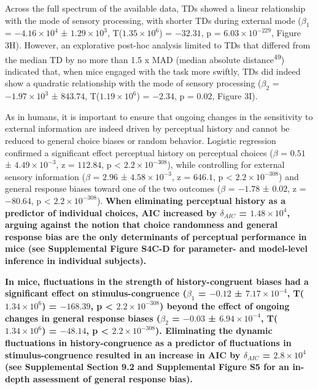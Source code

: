 \documentclass[
]{article}
\begin{document}
Across the full spectrum of the available data, TDs showed a linear
relationship with the mode of sensory processing, with shorter TDs
during external mode (\(\beta_1\) = \(\ensuremath{-4.16\times 10^{4}}\)
± \(\ensuremath{1.29\times 10^{3}}\),
T(\(\ensuremath{1.35\times 10^{6}}\)) = \(-32.31\), p =
\(\ensuremath{6.03\times 10^{-229}}\), Figure 3H). However, an
explorative post-hoc analysis limited to TDs that differed from the
median TD by no more than 1.5 x MAD (median absolute
distance\textsuperscript{49}) indicated that, when mice engaged with the
task more swiftly, TDs did indeed show a quadratic relationship with the
mode of sensory processing (\(\beta_2\) =
\(\ensuremath{-1.97\times 10^{3}}\) ± \(843.74\),
T(\(\ensuremath{1.19\times 10^{6}}\)) = \(-2.34\), p = \(0.02\), Figure
3I).

As in humans, it is important to ensure that ongoing changes in the
sensitivity to external information are indeed driven by perceptual
history and cannot be reduced to general choice biases or random
behavior. Logistic regression confirmed a significant effect perceptual
history on perceptual choices (\(\beta\) = \(0.51\) ±
\(\ensuremath{4.49\times 10^{-3}}\), z = \(112.84\), p < \(\ensuremath{2.2\times 10^{-308}}\)), while
controlling for external sensory information (\(\beta\) = \(2.96\) ±
\(\ensuremath{4.58\times 10^{-3}}\), z = \(646.1\), p < \(\ensuremath{2.2\times 10^{-308}}\)) and
general response biases toward one of the two outcomes (\(\beta\) =
\(-1.78\) ± \(0.02\), z = \(-80.64\), p < \(\ensuremath{2.2\times 10^{-308}}\)). \textbf{When
eliminating perceptual history as a predictor of individual choices, AIC
increased by \(\delta_{AIC}\) = \(\ensuremath{1.48\times 10^{4}}\),
arguing against the notion that choice randomness and general response
bias are the only determinants of perceptual performance in mice (see
Supplemental Figure S4C-D for parameter- and model-level inference in
individual subjects).}

\textbf{In mice, fluctuations in the strength of history-congruent
biases had a significant effect on stimulus-congruence (\(\beta_1\) =
\(-0.12\) ± \(\ensuremath{7.17\times 10^{-4}}\),
T(\(\ensuremath{1.34\times 10^{6}}\)) = \(-168.39\), p < \(\ensuremath{2.2\times 10^{-308}}\)) beyond
the effect of ongoing changes in general response biases (\(\beta_2\) =
\(-0.03\) ± \(\ensuremath{6.94\times 10^{-4}}\),
T(\(\ensuremath{1.34\times 10^{6}}\)) = \(-48.14\), p < \(\ensuremath{2.2\times 10^{-308}}\)).
Eliminating the dynamic fluctuations in history-congruence as a
predictor of fluctuations in stimulus-congruence resulted in an increase
in AIC by \(\delta_{AIC}\) = \(\ensuremath{2.8\times 10^{4}}\) (see
Supplemental Section 9.2 and Supplemental Figure S5 for an in-depth
assessment of general response bias).}
\end{document}
